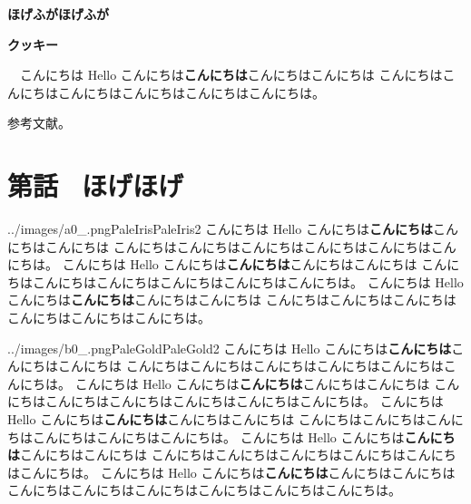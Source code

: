 \documentclass[b5paper,xelatex,ja=standard,11pt]{bxjsarticle}
\begin{document}
\vspace*{0.05\textheight}
\centerline{\fontsize{27pt}{10pt}\selectfont\bf ほげふがほげふが}
\vspace*{10pt}
\centerline{\fontsize{15pt}{10pt}\selectfont\bf クッキー}
\vspace*{5pt}
\begin{center}
\begin{minipage}[t]{0.8\textwidth}
　こんにちは Hello こんにちは{\bf こんにちは}こんにちはこんにちは
こんにちはこんにちはこんにちはこんにちはこんにちはこんにちは。
\end{minipage}
\end{center}
\vspace*{3pt}

\begin{thebibliography}{9}
   参考文献。
\end{thebibliography}

\vspace*{-20pt}
\begin{spacing}{1.1}\textbf{\tableofcontents}\end{spacing}

\newcommand*{\mysectiontitle}{第{\themycounter}話 \, ほげほげ}
\section*{\mysectiontitle}\addcontentsline{toc}{section}{\mysectiontitle}

\begin{SERIFU}[enlarge top by=3pt]{../images/a0_.png}{PaleIris}{PaleIris2}
こんにちは Hello こんにちは{\bf こんにちは}こんにちはこんにちは
こんにちはこんにちはこんにちはこんにちはこんにちはこんにちは。
こんにちは Hello こんにちは{\bf こんにちは}こんにちはこんにちは
こんにちはこんにちはこんにちはこんにちはこんにちはこんにちは。
こんにちは Hello こんにちは{\bf こんにちは}こんにちはこんにちは
こんにちはこんにちはこんにちはこんにちはこんにちはこんにちは。
\end{SERIFU}

\begin{SERIFU}[enlarge bottom by=0pt]{../images/b0_.png}{PaleGold}{PaleGold2}
こんにちは Hello こんにちは{\bf こんにちは}こんにちはこんにちは
こんにちはこんにちはこんにちはこんにちはこんにちはこんにちは。
こんにちは Hello こんにちは{\bf こんにちは}こんにちはこんにちは
こんにちはこんにちはこんにちはこんにちはこんにちはこんにちは。
こんにちは Hello こんにちは{\bf こんにちは}こんにちはこんにちは
こんにちはこんにちはこんにちはこんにちはこんにちはこんにちは。
こんにちは Hello こんにちは{\bf こんにちは}こんにちはこんにちは
こんにちはこんにちはこんにちはこんにちはこんにちはこんにちは。
こんにちは Hello こんにちは{\bf こんにちは}こんにちはこんにちは
こんにちはこんにちはこんにちはこんにちはこんにちはこんにちは。
\end{SERIFU}
\end{document}
